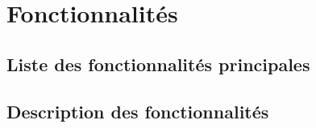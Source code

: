 \section{Fonctionnalités}
\subsection{Liste des fonctionnalités principales}
\subsection{Description des fonctionnalités}
    \decrireFonctionPrincipal